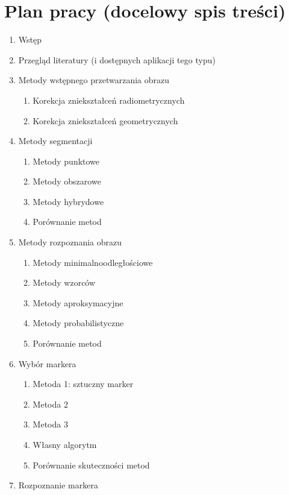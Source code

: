 \chapter{Plan pracy (docelowy spis treści)}

\begin{enumerate}
 \item Wstęp
 \item Przegląd literatury (i dostępnych aplikacji tego typu)
 \item Metody wstępnego przetwarzania obrazu~\cite{graf:przet:obr, anal:przet:obr, geo:tools}
  \begin{enumerate}
   \item Korekcja zniekształceń radiometrycznych
   \item Korekcja zniekształceń geometrycznych
  \end{enumerate}
 \item Metody segmentacji~\cite{graf:przet:obr, anal:przet:obr, roz:obr}
  \begin{enumerate}
   \item Metody punktowe
   \item Metody obszarowe
   \item Metody hybrydowe
   \item Porównanie metod
  \end{enumerate}
 \item Metody rozpoznania obrazu~\cite{graf:przet:obr, anal:przet:obr, roz:obr}
  \begin{enumerate}
   \item Metody minimalnoodległościowe
   \item Metody wzorców
   \item Metody aproksymacyjne
   \item Metody probabilistyczne
   \item Porównanie metod
  \end{enumerate}
 \item Wybór markera~\cite{pic:desc, img:proc, now:przet:obr}
  \begin{enumerate}
   \item Metoda 1: sztuczny marker
   \item Metoda 2
   \item Metoda 3
   \item Własny algorytm
   \item Porównanie skuteczności metod
  \end{enumerate}
 \item Rozpoznanie markera~\cite{roz:obr, pic:desc, img:proc, mar:det}

\end{enumerate}
